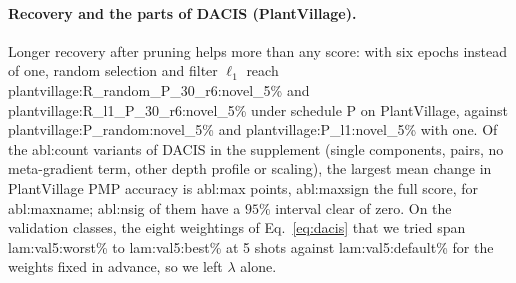 \paragraph{Recovery and the parts of DACIS (PlantVillage).}
Longer recovery after pruning helps more than any score: with six epochs instead of one, random selection and filter $\ell_1$ reach \num{plantvillage:R_random_P_30_r6:novel_5}\% and \num{plantvillage:R_l1_P_30_r6:novel_5}\% under schedule P on PlantVillage, against \num{plantvillage:P_random:novel_5}\% and \num{plantvillage:P_l1:novel_5}\% with one. Of the \num{abl:count} variants of DACIS in the supplement (single components, pairs, no meta-gradient term, other depth profile or scaling), the largest mean change in PlantVillage PMP accuracy is \num{abl:max} points, \num{abl:maxsign} the full score, for \num{abl:maxname}; \num{abl:nsig} of them have a $95\%$ interval clear of zero. \label{sec:lambda}On the validation classes, the eight weightings of Eq.~\eqref{eq:dacis} that we tried span \num{lam:val5:worst}\% to \num{lam:val5:best}\% at 5 shots against \num{lam:val5:default}\% for the weights fixed in advance, so we left $\lambda$ alone.
